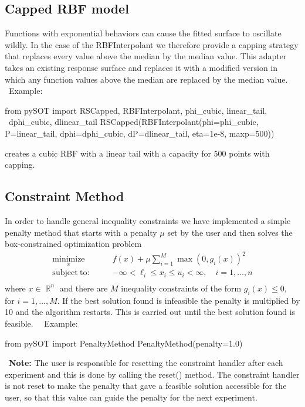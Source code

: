 \documentclass[]{article}
\DeclareMathOperator{\Rb}{\mathbb{R}}
\begin{document}
\subsection{Capped RBF model} Functions with exponential behaviors can cause the fitted surface to oscillate wildly. In the case of the RBFInterpolant we therefore provide a capping strategy that replaces every value above the median by the median value. This adapter takes an existing response surface and replaces it with a modified version in which any function values above the median are replaced by the median value. \\
\ \newline Example: 
\begin{python}
from pySOT import RSCapped, RBFInterpolant, phi_cubic, linear_tail, \
	          dphi_cubic, dlinear_tail
RSCapped(RBFInterpolant(phi=phi_cubic, P=linear_tail, dphi=dphi_cubic, 
                        dP=dlinear_tail, eta=1e-8, maxp=500))
\end{python}
creates a cubic RBF with a linear tail with a capacity for 500 points with capping.

\subsection{Constraint Method} In order to handle general inequality constraints we have implemented a simple penalty method that starts with a penalty $\mu$ set by the user and then solves the box-constrained optimization problem 
\begin{align*}
\underset{x}{\operatorname{minimize}} \qquad &f(x)+\mu \sum_{i=1}^M \max(0,g_i(x))^2 \\
\operatorname{subject\;to:} \qquad &-\infty<\ell_i \leq x_i \leq u_i<\infty, \quad i = 1,\ldots,n \\
\end{align*}
where $x \in \Rb^n$ and there are $M$ inequality constraints of the form $g_i(x) \leq 0,$ for $i=1,\ldots,M$. If the best solution found is infeasible the penalty is multiplied by 10 and the algorithm restarts. This is carried out until the best solution found is feasible.
\ \newline \ \newline Example: 
\begin{python}
from pySOT import PenaltyMethod
PenaltyMethod(penalty=1.0)
\end{python}
\ \newline \noindent \textbf{Note:} The user is responsible for resetting the constraint handler after each experiment and this is done by calling the reset() method. The constraint handler is not reset to make the penalty that gave a feasible solution accessible for the user, so that this value can guide the penalty for the next experiment.
\end{document}
